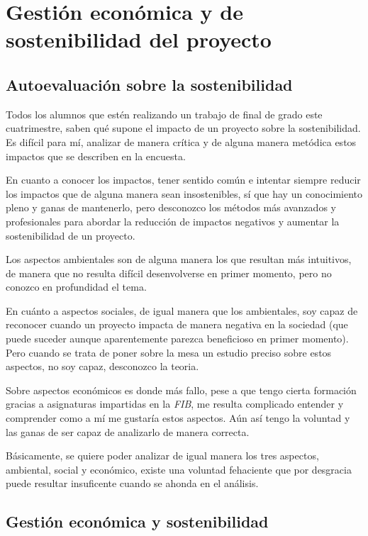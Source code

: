 \section{Gestión económica y de sostenibilidad del proyecto}
\label{sec:sostenibilidad}
\subsection{Autoevaluación sobre la sostenibilidad}

Todos los alumnos que estén realizando un trabajo de final de grado este cuatrimestre, saben qué supone el impacto de un proyecto sobre la sostenibilidad. Es difícil para mí, analizar de manera crítica y de alguna manera metódica estos impactos que se describen en la encuesta. 
\par\medskip
En cuanto a conocer los impactos, tener sentido común e intentar siempre reducir los impactos que de alguna manera sean insostenibles, sí que hay un conocimiento pleno y ganas de mantenerlo, pero desconozco los métodos más avanzados y profesionales para abordar la reducción de impactos negativos y aumentar la sostenibilidad de un proyecto.
\par\medskip
Los aspectos ambientales son de alguna manera los que resultan más intuitivos, de manera que no resulta difícil desenvolverse en primer momento, pero no conozco en profundidad el tema.
\par\medskip
En cuánto a aspectos sociales, de igual manera que los ambientales, soy capaz de reconocer cuando un proyecto impacta de manera negativa en la sociedad (que puede suceder aunque aparentemente parezca beneficioso en primer momento). Pero cuando se trata de poner sobre la mesa un estudio preciso sobre estos aspectos, no soy capaz, desconozco la teoria.
\par\medskip
Sobre aspectos económicos es donde más fallo, pese a que tengo cierta formación gracias a asignaturas impartidas en la \textit{FIB}, me resulta complicado entender y comprender como a mí me gustaría estos aspectos. Aún así tengo la voluntad y las ganas de ser capaz de analizarlo de manera correcta.
\par\medskip
Básicamente, se quiere poder analizar de igual manera los tres aspectos, ambiental, social y económico, existe una voluntad fehaciente que por desgracia puede resultar insuficente cuando se ahonda en el análisis.

\subsection{Gestión económica y sostenibilidad}

